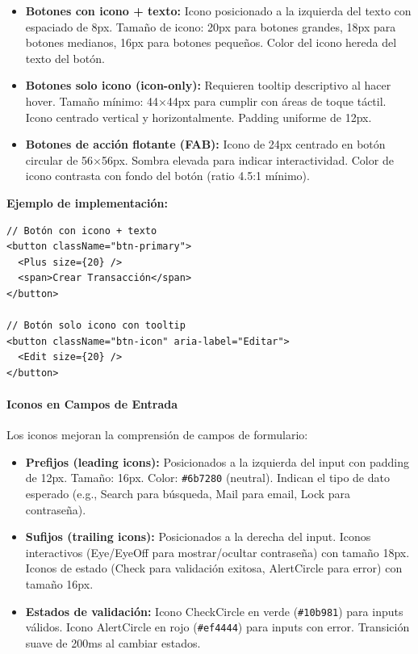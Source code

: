 \documentclass[12pt,a4paper,oneside]{article}
\begin{document}
\begin{itemize}
    \item \textbf{Botones con icono + texto:} Icono posicionado a la izquierda del texto con espaciado de 8px. Tamaño de icono: 20px para botones grandes, 18px para botones medianos, 16px para botones pequeños. Color del icono hereda del texto del botón.
    
    \item \textbf{Botones solo icono (icon-only):} Requieren tooltip descriptivo al hacer hover. Tamaño mínimo: 44×44px para cumplir con áreas de toque táctil. Icono centrado vertical y horizontalmente. Padding uniforme de 12px.
    
    \item \textbf{Botones de acción flotante (FAB):} Icono de 24px centrado en botón circular de 56×56px. Sombra elevada para indicar interactividad. Color de icono contrasta con fondo del botón (ratio 4.5:1 mínimo).
\end{itemize}

\textbf{Ejemplo de implementación:}

\begin{verbatim}
// Botón con icono + texto
<button className="btn-primary">
  <Plus size={20} />
  <span>Crear Transacción</span>
</button>

// Botón solo icono con tooltip
<button className="btn-icon" aria-label="Editar">
  <Edit size={20} />
</button>
\end{verbatim}

\paragraph{Iconos en Campos de Entrada}
Los iconos mejoran la comprensión de campos de formulario:

\begin{itemize}
    \item \textbf{Prefijos (leading icons):} Posicionados a la izquierda del input con padding de 12px. Tamaño: 16px. Color: \texttt{\#6b7280} (neutral). Indican el tipo de dato esperado (e.g., Search para búsqueda, Mail para email, Lock para contraseña).
    
    \item \textbf{Sufijos (trailing icons):} Posicionados a la derecha del input. Iconos interactivos (Eye/EyeOff para mostrar/ocultar contraseña) con tamaño 18px. Iconos de estado (Check para validación exitosa, AlertCircle para error) con tamaño 16px.
    
    \item \textbf{Estados de validación:} Icono CheckCircle en verde (\texttt{\#10b981}) para inputs válidos. Icono AlertCircle en rojo (\texttt{\#ef4444}) para inputs con error. Transición suave de 200ms al cambiar estados.
\end{itemize}
\end{document}
